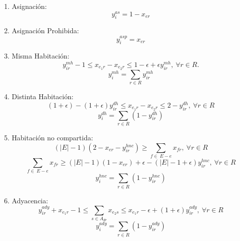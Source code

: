 \documentclass[letter, 10pt]{article}
\begin{document}
\begin{enumerate}
    \item Asignaci\'on:
    \begin{equation}
        y_{i}^{as} = 1 - x_{er}
    \end{equation}
    \item Asignaci\'on Prohibida: 
    \begin{equation}
        y_{i}^{asp} = x_{er}
    \end{equation}
    \item Misma Habitaci\'on: 
    \begin{equation}
        y_{ir}^{mh} - 1 \leq x_{e_1r} - x_{e_2r} \leq 1 - \epsilon + \epsilon y_{ir}^{mh}, \ \forall r \in R. 
    \end{equation}
    \begin{equation}
        y_{i}^{mh} = \sum_{r \in R} y_{ir}^{mh}
    \end{equation}
    \item Distinta Habitaci\'on: 
    \begin{equation}
        (1 + \epsilon) - (1 + \epsilon)y_{ir}^{dh} \leq x_{e_1r} - x_{e_2r} \leq 2 - y_{ir}^{dh}, \ \forall r \in R 
    \end{equation}
    \begin{equation}
        y_{i}^{dh} = \sum_{r \in R} (1 - y_{ir}^{dh}) 
    \end{equation}
    \item Habitaci\'on no compartida: 
    \begin{equation}
        (|E| - 1)(2 - x_{er} - y_{ir}^{hnc}) \geq \sum_{f \in \ E-e} x_{fr}, \ \forall r \in R 
    \end{equation}
    \begin{equation}
        \sum_{f \in \ E-e} x_{fr} \geq (|E| - 1)(1 - x_{er})+ \epsilon - (|E| - 1 + \epsilon)y_{ir}^{hnc}, \ \forall r \in R
    \end{equation}
    \begin{equation}
        y_{i}^{hnc} = \sum_{r \in R} (1-y_{ir}^{hnc})
    \end{equation}
    \item Adyacencia: 
    \begin{equation}
        y_{ir}^{ady} + x_{e_1r} - 1 \leq \sum_{s \in A_{dr}} x_{e_2s} \leq x_{e_1r} - \epsilon + (1 + \epsilon) y_{ir}^{ady}, \ \forall r \in R 
    \end{equation}
    \begin{equation}
        y_{i}^{ady} = \sum_{r \in R} (1-y_{ir}^{ady})

\end{equation}
\end{enumerate}
\end{document}
